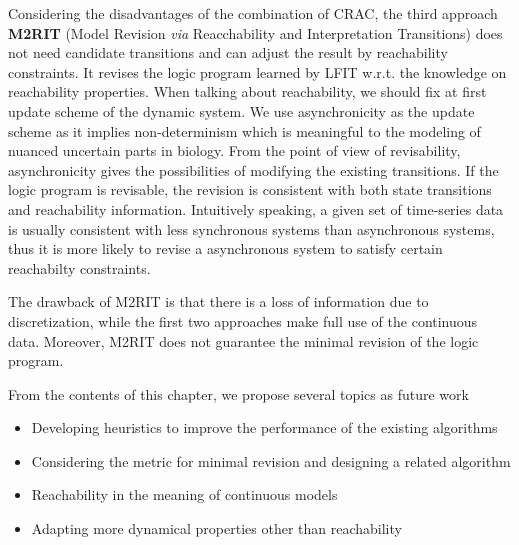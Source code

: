 Considering the disadvantages of the combination of CRAC, the third approach \textbf{M2RIT} (Model Revision \textit{via} Reacchability and Interpretation Transitions) does not need candidate transitions and can adjust the result by reachability constraints.
It revises the logic program learned by LFIT w.r.t. the knowledge on reachability properties.
When talking about reachability, we should fix at first update scheme of the dynamic system.
We use asynchronicity as the update scheme as it implies non-determinism which is meaningful to the modeling of nuanced uncertain parts in biology.
From the point of view of revisability, asynchronicity gives the possibilities of modifying the existing transitions.
If the logic program is revisable, the revision is consistent with both state transitions and reachability information.
Intuitively speaking, a given set of time-series data is usually consistent with less synchronous systems than asynchronous systems, thus it is more likely to revise a asynchronous system to satisfy certain reachabilty constraints.

The drawback of M2RIT is that there is a loss of information due to discretization, while the first two approaches make full use of the continuous data.
Moreover, M2RIT does not guarantee the minimal revision of the logic program.

From the contents of this chapter, we propose several topics as future work
\begin{itemize}
    \item Developing heuristics to improve the performance of the existing algorithms
    \item Considering the metric for minimal revision and designing a related algorithm
    \item Reachability in the meaning of continuous models
    \item Adapting more dynamical properties other than reachability
\end{itemize}